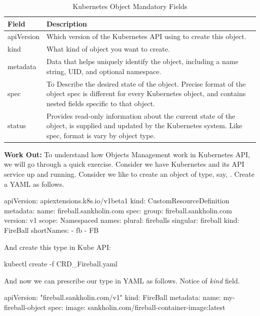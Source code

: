 \begin{table}[H]
\centering
    \begin{tabular}{ | l | p{11cm} |}
    \hline
    Field & Description \\ \hline
    apiVersion & Which version of the Kubernetes API using to create this object. \\ \hline
    kind & What kind of object you want to create. \\ \hline
    metadata & Data that helps uniquely identify the object, including a name string, UID, and optional namespace. \\ \hline
    spec & To Describe the desired state of the object. Precise format of the object spec is different for every Kubernetes object, and contains nested fields specific to that object. \\ \hline
    status & Provides read-only information about the current state of the object, is supplied and updated by the Kubernetes system. Like spec, format is vary by object type. \\
    \hline
    \end{tabular}
\caption{Kubernetes Object Mandatory Fields}
\label{kubeObjectTable}
\end{table}

\noindent\textbf{Work Out:} \quad To understand how Objects Management work in Kubernetes API, we will go through a quick exercise. Consider we have Kubernetes and its API service up and running. Consider we like to create an object of type, say, . Create a YAML as follows.

\begin{lcverbatim}
apiVersion: apiextensions.k8s.io/v1beta1
kind: CustomResourceDefinition
metadata:
  name: fireball.sankholin.com
spec:
  group: fireball.sankholin.com
  version: v1
  scope: Namespaced
  names:
    plural: fireballs
    singular: fireball
    kind: FireBall
    shortNames: 
    - fb
    - FB
\end{lcverbatim}

\noindent And create this  type in Kube API:
\begin{lcverbatim}
kubectl create -f  CRD_Fireball.yaml
\end{lcverbatim}

\noindent And now we can prescribe our  type in YAML as follows. Notice of \emph{kind} field.

\begin{lcverbatim}
apiVersion: "fireball.sankholin.com/v1"
kind: FireBall
metadata:
  name: my-fireball-object
spec:
  image: sankholin.com/fireball-container-image:latest
\end{lcverbatim}

